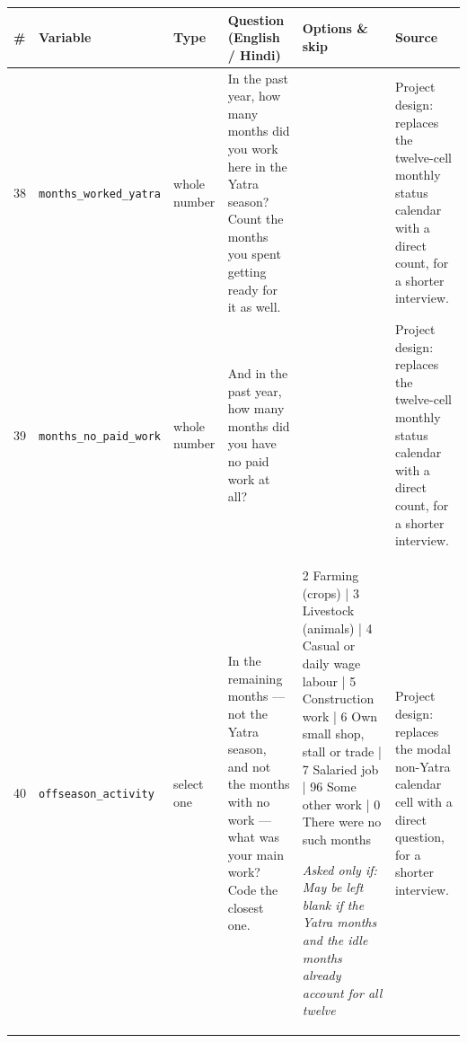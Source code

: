 \documentclass[9pt,a4paper,landscape]{article}
\begin{document}
\begin{longtable}{@{}p{0.5cm}p{3.3cm}p{1.7cm}p{7.3cm}p{5.6cm}p{5.4cm}@{}}
\toprule \footnotesize\textbf{\#} & \footnotesize\textbf{Variable} & \footnotesize\textbf{Type} & \footnotesize\textbf{Question (English / Hindi)} & \footnotesize\textbf{Options {\&} skip} & \footnotesize\textbf{Source}\\ \midrule
\endhead
\footnotesize 38 & \footnotesize\texttt{months\_worked\_yatra} & \scriptsize whole number & \footnotesize In the past year, how many months did you work here in the Yatra season? Count the months you spent getting ready for it as well.\par\vspace{1pt}{\footnotesize\color{hdr}{\hifont पिछले साल में आपने यात्रा के सीज़न में यहाँ कितने महीने काम किया? सीज़न की तैयारी के महीने भी गिनें।}} & \scriptsize  & \scriptsize Project design: replaces the twelve-cell monthly status calendar with a direct count, for a shorter interview.\\
\footnotesize 39 & \footnotesize\texttt{months\_no\_paid\_work} & \scriptsize whole number & \footnotesize And in the past year, how many months did you have no paid work at all?\par\vspace{1pt}{\footnotesize\color{hdr}{\hifont और पिछले साल में कितने महीने आपके पास कोई कमाई वाला काम नहीं था?}} & \scriptsize  & \scriptsize Project design: replaces the twelve-cell monthly status calendar with a direct count, for a shorter interview.\\
\footnotesize 40 & \footnotesize\texttt{offseason\_activity} & \scriptsize select one & \footnotesize In the remaining months — not the Yatra season, and not the months with no work — what was your main work? Code the closest one.\par\vspace{1pt}{\footnotesize\color{hdr}{\hifont बाकी महीनों में — जो यात्रा के सीज़न के नहीं थे और जिनमें काम भी था — आपका मुख्य काम क्या था? सबसे नज़दीकी चुनें।}} & \scriptsize 2 Farming (crops) | 3 Livestock (animals) | 4 Casual or daily wage labour | 5 Construction work | 6 Own small shop, stall or trade | 7 Salaried job | 96 Some other work | 0 There were no such months\par\vspace{1pt}\textit{Asked only if: May be left blank if the Yatra months and the idle months already account for all twelve} & \scriptsize Project design: replaces the modal non-Yatra calendar cell with a direct question, for a shorter interview.\\

\end{longtable}
\end{document}
